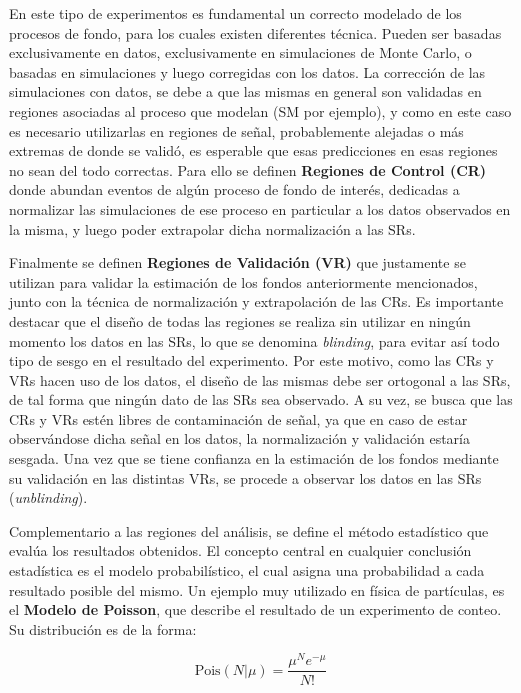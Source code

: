 En este tipo de experimentos es fundamental un correcto modelado de los procesos de fondo,  para los cuales existen diferentes técnica. Pueden ser basadas exclusivamente en datos, exclusivamente en simulaciones de Monte Carlo, o basadas en simulaciones y  luego corregidas con los datos. La corrección de las simulaciones con datos, se debe a que las mismas en general son validadas en regiones asociadas al proceso que modelan (SM por ejemplo), y como en este caso es necesario utilizarlas en regiones de señal, probablemente alejadas o más extremas de donde se validó, es esperable que esas predicciones en esas regiones no sean del todo correctas. Para ello se definen \textbf{Regiones de Control (CR)} donde abundan eventos de algún proceso de fondo de interés, dedicadas a normalizar las simulaciones de ese proceso en particular a los datos observados en la misma, y luego poder extrapolar dicha normalización a las SRs.

Finalmente se definen \textbf{Regiones de Validación (VR)} que justamente se utilizan para validar la estimación de los fondos anteriormente mencionados, junto con la técnica de normalización y extrapolación de las CRs. Es importante destacar que el diseño de todas las regiones se realiza sin utilizar en ningún momento los datos en las SRs, lo que se denomina \textit{blinding}, para evitar así todo tipo de sesgo en el resultado del experimento. Por este motivo, como las CRs y VRs hacen uso de los datos, el diseño de las mismas debe ser ortogonal a las SRs, de tal forma que ningún dato de las SRs sea observado. A su vez, se busca que las CRs y VRs estén libres de contaminación de señal, ya que en caso de estar observándose dicha señal en los datos, la normalización y validación estaría sesgada.
Una vez que se tiene confianza en la estimación de los fondos mediante su validación en las distintas VRs, se procede a observar los datos en las SRs (\textit{unblinding}).

Complementario a las regiones del análisis, se define el método estadístico que evalúa los resultados obtenidos. El concepto central en cualquier conclusión estadística es el modelo probabilístico, el cual asigna una probabilidad a cada resultado posible del mismo. Un ejemplo muy utilizado en física de partículas, es el \textbf{Modelo de Poisson}, que describe el resultado de un experimento de conteo. Su distribución es de la forma:

\begin{equation}
	\text{Pois}(N|\mu) = \frac{\mu^{N}e^{-\mu}}{N!}
\end{equation}

